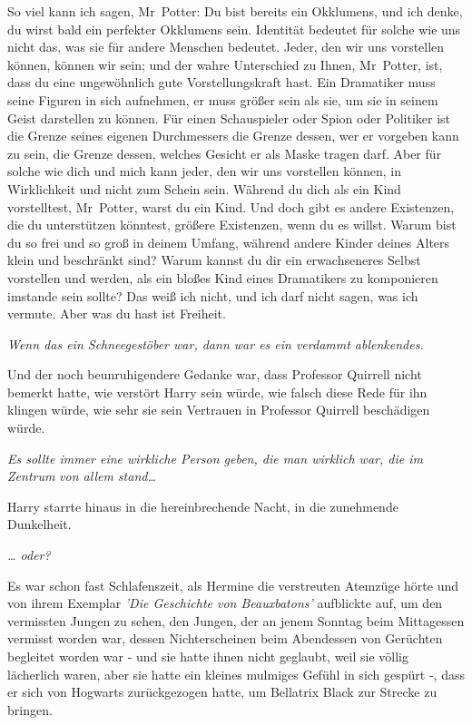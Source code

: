 {So viel kann ich sagen, Mr~Potter: Du bist bereits ein Okklumens, und ich denke, du wirst bald ein perfekter Okklumens sein. Identität bedeutet für solche wie uns nicht das, was sie für andere Menschen bedeutet. Jeder, den wir uns vorstellen können, können wir sein; und der wahre Unterschied zu Ihnen, Mr~Potter, ist, dass du eine ungewöhnlich gute Vorstellungskraft hast. Ein Dramatiker muss seine Figuren in sich aufnehmen, er muss größer sein als sie, um sie in seinem Geist darstellen zu können. Für einen Schauspieler oder Spion oder Politiker ist die Grenze seines eigenen Durchmessers die Grenze dessen, wer er vorgeben kann zu sein, die Grenze dessen, welches Gesicht er als Maske tragen darf. Aber für solche wie dich und mich kann jeder, den wir uns vorstellen können, in Wirklichkeit und nicht zum Schein sein. Während du dich als ein Kind vorstelltest, Mr~Potter, warst du ein Kind. Und doch gibt es andere Existenzen, die du unterstützen könntest, größere Existenzen, wenn du es willst. Warum bist du so frei und so groß in deinem Umfang, während andere Kinder deines Alters klein und beschränkt sind? Warum kannst du dir ein erwachseneres Selbst vorstellen und werden, als ein bloßes Kind eines Dramatikers zu komponieren imstande sein sollte? Das weiß ich nicht, und ich darf nicht sagen, was ich vermute. Aber was du hast ist Freiheit.

\emph{Wenn das ein Schneegestöber war, dann war es ein verdammt ablenkendes.}

Und der noch beunruhigendere Gedanke war, dass Professor Quirrell nicht bemerkt hatte, wie verstört Harry sein würde, wie falsch diese Rede für ihn klingen würde, wie sehr sie sein Vertrauen in Professor Quirrell beschädigen würde.

\emph{Es sollte immer eine wirkliche Person geben, die man wirklich war, die im Zentrum} \emph{von allem stand…}

Harry starrte hinaus in die hereinbrechende Nacht, in die zunehmende Dunkelheit.

\emph{… oder?}

Es war schon fast Schlafenszeit, als Hermine die verstreuten Atemzüge hörte und von ihrem Exemplar \emph{'Die Geschichte von Beauxbatons'} aufblickte auf, um den vermissten Jungen zu sehen, den Jungen, der an jenem Sonntag beim Mittagessen vermisst worden war, dessen Nichterscheinen beim Abendessen von Gerüchten begleitet worden war - und sie hatte ihnen nicht geglaubt, weil sie völlig lächerlich waren, aber sie hatte ein kleines mulmiges Gefühl in sich gespürt -, dass er sich von Hogwarts zurückgezogen hatte, um Bellatrix Black zur Strecke zu bringen.

}
